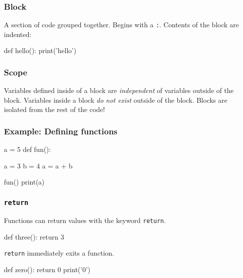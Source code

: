 \documentclass[11pt]{beamer}
\begin{document}
\begin{frame}[fragile]
  \frametitle{Block}
  \Enlarge

  \begin{itemize}
  \myitem  A section of code grouped together. \pause
  \myitem  Begins with a \texttt{:}. \pause
  \myitem  Contents of the block are indented:
  \end{itemize}
  \begin{semiverbatim}
def hello():
    print('hello')
  \end{semiverbatim}
\end{frame}

\begin{frame}
  \frametitle{Scope}
  \Enlarge

  \begin{itemize}
  \myitem  Variables defined inside of a block are \emph{independent} of variables outside of the block. \pause
  \myitem  Variables inside a block \emph{do not exist} outside of the block. \pause
  \myitem  Blocks are isolated from the rest of the code!
  \end{itemize}
\end{frame}

\begin{frame}[fragile]
  \frametitle{Example:  Defining functions}
  \Enlarge

  \begin{semiverbatim}
a = 5
def fun():
  \end{semiverbatim}
\textcolor{CS101PureBase}{
  \begin{semiverbatim}
    a = 3
    b = 4
    a = a + b
  \end{semiverbatim}
}
  \begin{semiverbatim}
fun()
print(a)
  \end{semiverbatim}
\end{frame}

\begin{frame}[fragile]
  \frametitle{\texttt{return}}
  \Enlarge

  \begin{itemize}
  \myitem  Functions can return values with the keyword \texttt{return}. \pause
    \begin{semiverbatim}
def three():
    return 3
    \end{semiverbatim} \pause
  \myitem  \texttt{return} immediately exits a function. \pause
    \begin{semiverbatim}
def zero():
  return 0
  print('0')
    \end{semiverbatim}
  \end{itemize}
\end{frame}
\end{document}
